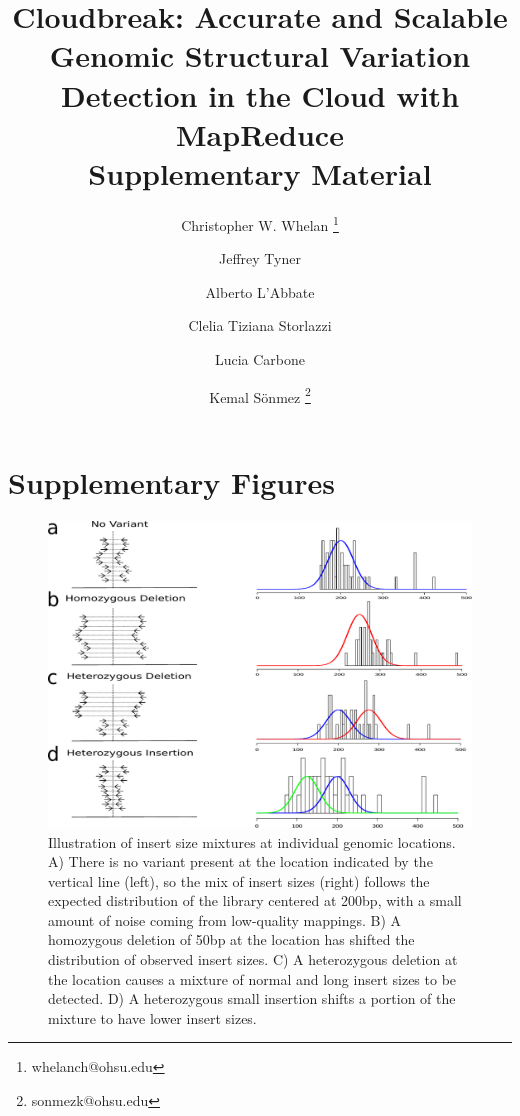 \documentclass[11pt]{article}
\begin{document}
\title{Cloudbreak: Accurate and Scalable Genomic Structural Variation Detection in the Cloud with MapReduce \\
Supplementary Material}

\author[1,5]{Christopher W. Whelan \thanks{whelanch@ohsu.edu}}
\author[3,4]{Jeffrey Tyner}
\author[6]{Alberto L'Abbate}
\author[6]{Clelia Tiziana Storlazzi}
\author[4,5]{Lucia Carbone}
\author[1,2,5]{Kemal S\"onmez \thanks{sonmezk@ohsu.edu}}

\maketitle

\tableofcontents

\newpage

\section{Supplementary Figures} 

\begin{figure}[h]
\centering
\includegraphics[width=1\textwidth]{insert_size_mixtures.pdf}
\caption{Illustration of insert size mixtures at individual genomic locations. A) There is no variant present at the location indicated by the vertical line (left), so the mix of insert sizes (right) follows the expected distribution of the library centered at 200bp, with a small amount of noise coming from low-quality mappings. B) A homozygous deletion of 50bp at the location has shifted the distribution of observed insert sizes. C) A heterozygous deletion at the location causes a mixture of normal and long insert sizes to be detected. D) A heterozygous small insertion shifts a portion of the mixture to have lower insert sizes.}
\label{insert_size_mixes}
\end{figure}
\end{document}

